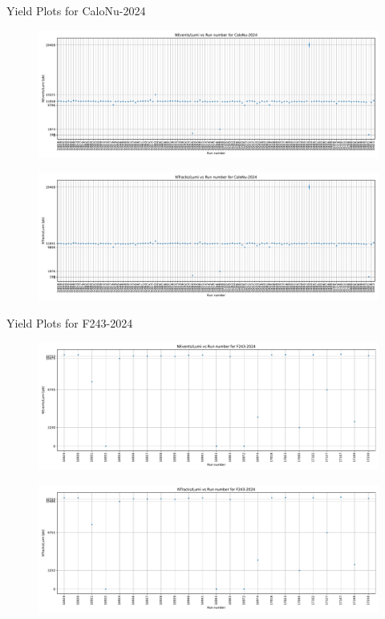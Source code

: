 \begin{frame}{Yield Plots for CaloNu-2024}
	\begin{figure}
		\includegraphics[height=0.4\textheight]{RunwisePlots/CaloNu-2024_NEventsbyLumi.pdf}
	\end{figure}
	\begin{figure}
		\includegraphics[height=0.4\textheight]{RunwisePlots/CaloNu-2024_NTracksbyLumi.pdf}
	\end{figure}
\end{frame}

\begin{frame}{Yield Plots for F243-2024}
	\begin{figure}
		\includegraphics[height=0.4\textheight]{RunwisePlots/F243-2024_NEventsbyLumi.pdf}
	\end{figure}
	\begin{figure}
		\includegraphics[height=0.4\textheight]{RunwisePlots/F243-2024_NTracksbyLumi.pdf}
	\end{figure}
\end{frame}

